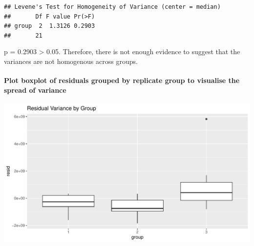 \documentclass[
]{article}
\newenvironment{Shaded}{\begin{snugshade}}{\end{snugshade}}
\newcommand{\AttributeTok}[1]{\textcolor[rgb]{0.13,0.29,0.53}{#1}}
\newcommand{\FunctionTok}[1]{\textcolor[rgb]{0.13,0.29,0.53}{\textbf{#1}}}
\newcommand{\NormalTok}[1]{#1}
\newcommand{\OtherTok}[1]{\textcolor[rgb]{0.56,0.35,0.01}{#1}}
\newcommand{\SpecialCharTok}[1]{\textcolor[rgb]{0.81,0.36,0.00}{\textbf{#1}}}
\newcommand{\StringTok}[1]{\textcolor[rgb]{0.31,0.60,0.02}{#1}}
\begin{document}
\begin{Shaded}
\end{Shaded}

\begin{verbatim}
## Levene's Test for Homogeneity of Variance (center = median)
##       Df F value Pr(>F)
## group  2  1.3126 0.2903
##       21
\end{verbatim}

p = 0.2903 \textgreater{} 0.05. Therefore, there is not enough evidence
to suggest that the variances are not homogenous across groups.

\paragraph{Plot boxplot of residuals grouped by replicate group to
visualise the spread of
variance}\label{plot-boxplot-of-residuals-grouped-by-replicate-group-to-visualise-the-spread-of-variance}

\begin{Shaded}
\end{Shaded}

\includegraphics{analysis_files/figure-latex/a-1.pdf}
\end{document}
